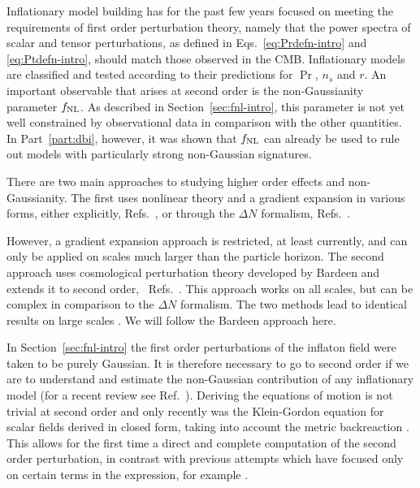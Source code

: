 Inflationary model building has for the past few years focused on
meeting the requirements of first order perturbation theory, namely
that the power spectra of scalar and tensor perturbations, as defined in
Eqs.~\eqref{eq:Prdefn-intro} and \eqref{eq:Ptdefn-intro}, should match
those observed in the CMB.  Inflationary
models are classified and tested according to their predictions for $\Pr$, $n_s$ and
$r$. 
An important observable that arises at second order is the non-Gaussianity
parameter $f_{\mathrm{NL}}$. As described in Section~\ref{sec:fnl-intro}, this parameter is
not yet well constrained by observational data in comparison with the
other quantities. In Part~\ref{part:dbi}, however, it was shown that $f_{\mathrm{NL}}$ can
already be used to rule out models with particularly strong non-Gaussian signatures.


There are two main approaches to studying higher order effects and
non-Gaussianity.  
The first uses nonlinear theory and a gradient expansion in various
forms, either explicitly, \eg
Refs.~\cite{Salopek:1990jq,Rigopoulos:2005xx}, or through the
$\Delta N$ formalism, \eg
Refs.~\cite{Starobinsky:1982ee,
Starobinsky:1986fxa, Sasaki:1995aw, Sasaki:1998ug,
Lyth:2004gb,Lyth:2005fi,Langlois:2006vv}.

However, a gradient expansion approach is restricted, at least
currently, and can only be applied on scales much larger than the particle horizon.  
The
second approach uses cosmological perturbation theory developed by Bardeen
\cite{Bardeen:1980kt} and extends it to second order,
\eg~Refs.~\cite{Tomita:1967,Mukhanov:1996ak,Bruni:1996im,
  Acquaviva:2002ud,Nakamura:2003wk,Noh:2004bc,
  Bernardeau:2002jy,Maldacena:2002vr,
  Finelli:2003bp,Bartolo:2004if,Enqvist:2004bk,Lyth:2005du,Seery:2005gb,
  Malik:2003mv, Barnaby:2006cq}\footnotemark.
%
This approach works on all scales, but can be complex in comparison to the
$\Delta N$ formalism. The two methods lead to identical results on large scales
\cite{Malik:2005cy}. We
will follow the Bardeen approach here.


In Section~\ref{sec:fnl-intro} the first order perturbations of the inflaton field
were taken to be purely Gaussian. It is therefore 
necessary to go to second order if we are to understand and estimate
the non-Gaussian contribution of any inflationary model (for a recent
review see Ref.~\cite{Malik:2008im}). Deriving the equations of motion is
not trivial at second order and only recently was the Klein-Gordon
equation for scalar fields derived in closed form, taking into account the
metric backreaction \cite{Malik:2006ir}. This allows for the first time
a direct and complete computation of the second order perturbation, in
contrast with previous attempts which have focused only on certain
terms in the expression, for example .


